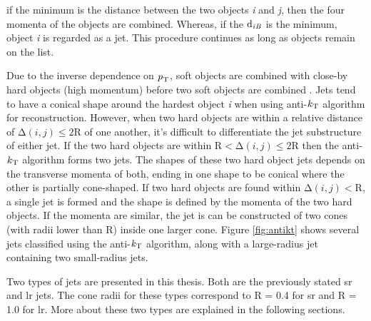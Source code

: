 if the minimum is the distance between the two objects \textit{i} and \textit{j}, then the four momenta of the objects are combined. Whereas, if the  $\textrm{d}_{\textrm{\textit{i}}\textrm{\textit{B}}}$
is the minimum, object \textit{i} is regarded as a jet. This procedure continues as long as objects remain on the list. 
\par
Due to the inverse dependence on $\textrm{\textit{p}}_{\textrm{T}}$, soft objects are combined with close-by hard objects (high momentum) before two soft objects are combined \cite{antikt}.
Jets tend to have a conical shape around the hardest object \textit{i} when using anti-$\textrm{\textit{k}}_{\textrm{T}}$ algorithm for reconstruction. However, when two hard objects are within a relative 
distance of $∆(\textit{i},\textit{j}) \le \textrm{2}\textrm{R}$ of one another, it's difficult to differentiate the jet substructure of either jet. If the two hard objects are within 
$\textrm{R} < ∆(\textit{i},\textit{j}) \le \textrm{2}\textrm{R}$ then the anti-$\textrm{\textit{k}}_{\textrm{T}}$ algorithm forms two jets. The shapes of these two hard object jets depends on the transverse 
momenta of both, ending in one shape to be conical where the other is partially cone-shaped. If two hard objects are found within $∆(\textit{i},\textit{j}) < \textrm{R}$, a single 
jet is formed and the shape is defined by the momenta of the two hard objects. If the momenta are similar, the jet is can be constructed of two cones (with radii lower than R)
inside one larger cone. Figure \ref{fig:antikt} shows several jets classified using the anti-$\textrm{\textit{k}}_{\textrm{T}}$ algorithm, along with a large-radius jet containing two small-radius jets. 
\par 
Two types of jets are presented in this thesis. Both are the previously stated \gls{sr} and \gls{lr} jets. The cone radii for these types correspond to R = 0.4 for \gls{sr} and 
R = 1.0 for \gls{lr}. More about these two types are explained in the following sections.

